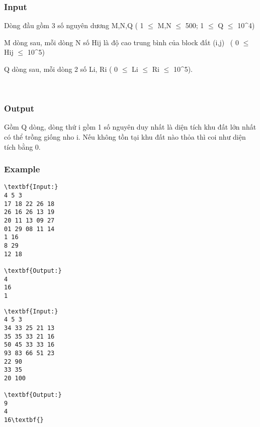 \subsubsection{Input}

Dòng đầu gồm 3 số nguyên dương M,N,Q ( 1  $\le$  M,N  $\le$  500; 1  $\le$  Q  $\le$  10\textasciicircum4)

M dòng sau, mỗi dòng N số Hij là độ cao trung bình của block đất (i,j)  ( 0  $\le$  Hij $\le$  10\textasciicircum5)

Q dòng sau, mỗi dòng 2 số Li, Ri ( 0  $\le$  Li $\le$  Ri $\le$  10\textasciicircum5).

 

\subsubsection{Output}

Gồm Q dòng, dòng thứ i gồm 1 số nguyên duy nhất là diện tích khu đất lớn nhất có thể trồng giống nho i. Nếu không tồn tại khu đất nào thỏa thì coi như diện tích bằng 0.

\subsubsection{Example}
\begin{verbatim}
\textbf{Input:}
4 5 3
17 18 22 26 18
26 16 26 13 19
20 11 13 09 27
01 29 08 11 14
1 16
8 29
12 18

\textbf{Output:}
4
16
1
\end{verbatim}
\begin{verbatim}
\textbf{Input:}
4 5 3
34 33 25 21 13
35 35 33 21 16
50 45 33 33 16
93 83 66 51 23
22 90
33 35
20 100

\textbf{Output:}
9
4
16\textbf{}\end{verbatim}
